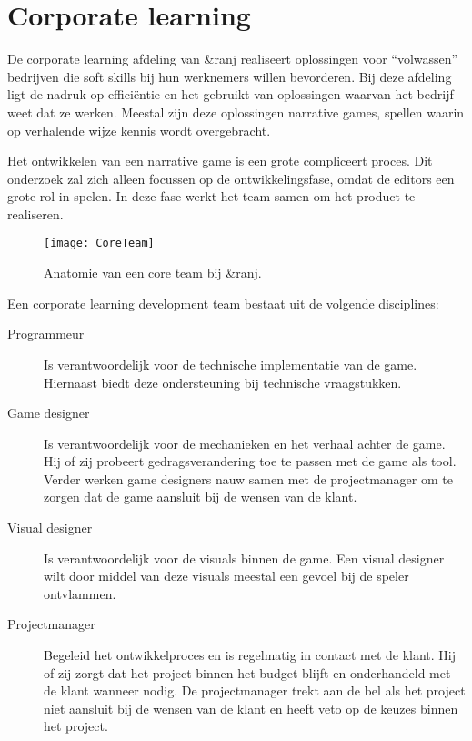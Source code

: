 \section{Corporate learning}
De corporate learning afdeling van \&ranj realiseert oplossingen voor “volwassen” bedrijven die soft skills bij hun werknemers willen bevorderen. Bij deze afdeling ligt de nadruk op efficiëntie en het gebruikt van oplossingen waarvan het bedrijf weet dat ze werken. Meestal zijn deze oplossingen narrative games, spellen waarin op verhalende wijze kennis wordt overgebracht.

Het ontwikkelen van een narrative game is een grote compliceert proces. Dit onderzoek zal zich alleen focussen op de ontwikkelingsfase, omdat de editors een grote rol in spelen. In deze fase werkt het team samen om het product te realiseren.

\begin{wrapfigure}{r}{0.45\textwidth}
    \texttt{[image: CoreTeam]}
    \caption{Anatomie van een core team bij \&ranj.}
    \label{fig:coreteam}
    \centering
\end{wrapfigure}

Een corporate learning development team bestaat uit de volgende disciplines:

\begin{description}
    \item[Programmeur] Is verantwoordelijk voor de technische implementatie van de game. Hiernaast biedt deze ondersteuning bij technische vraagstukken. 
    \item[Game designer] Is verantwoordelijk voor de mechanieken en het verhaal achter de game. Hij of zij probeert gedragsverandering toe te passen met de game als tool. Verder werken game designers nauw samen met de projectmanager om te zorgen dat de game aansluit bij de wensen van de klant.
    \item[Visual designer] Is verantwoordelijk voor de visuals binnen de game. Een visual designer wilt door middel van deze visuals meestal een gevoel bij de speler ontvlammen.
    \item[Projectmanager] Begeleid het ontwikkelproces en is regelmatig in contact met de klant. Hij of zij zorgt dat het project binnen het budget blijft en onderhandeld met de klant wanneer nodig. De projectmanager trekt aan de bel als het project niet aansluit bij de wensen van de klant en heeft veto op de keuzes binnen het project.    
\end{description}

